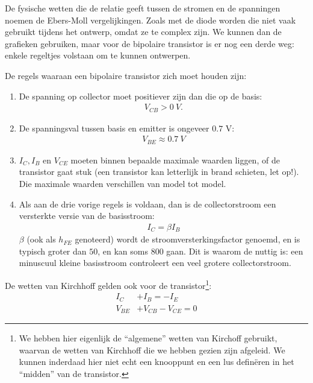 \documentclass{article}
\begin{document}
				De fysische wetten die de relatie geeft tussen de stromen en de spanningen noemen de Ebers-Moll vergelijkingen. Zoals met de diode worden die niet vaak gebruikt tijdens het ontwerp, omdat ze te complex zijn. We kunnen dan  de grafieken gebruiken, maar voor de bipolaire transistor is er nog een derde weg: enkele regeltjes volstaan om te kunnen ontwerpen. 

				De regels waaraan een bipolaire transistor zich moet houden zijn:
				\begin{enumerate}
					\item De spanning op collector moet positiever zijn dan die op de basis: 
					\begin{align}
					    V_{CB} > 0~V. 
					\end{align}

					\item De spanningsval tussen basis en emitter is ongeveer $0.7$ V: 
					\begin{align}
					    V_{BE} \approx 0.7~V
					\end{align}

					\item $I_C, I_B$ en $V_{CE} $ moeten binnen bepaalde maximale waarden liggen, of de transistor gaat stuk (een transistor kan letterlijk in brand schieten, let op!). Die maximale waarden verschillen van model tot model.

					\item Als aan de drie vorige regels is voldaan, dan is de collectorstroom een versterkte versie van de basisstroom: 
					\begin{align}
					    I_C = \beta I_B
					    \label{eq:hfe}
					\end{align}
					$\beta$ (ook als $h_{FE}$ genoteerd) wordt de stroomversterkingsfactor genoemd, en is typisch groter dan $50$, en kan soms $800$ gaan. Dit is waarom de nuttig is: een minuscuul kleine basisstroom controleert een veel grotere collectorstroom.

				\end{enumerate}

				De wetten van Kirchhoff gelden ook voor de transistor\footnote{We hebben hier eigenlijk de ``algemene'' wetten van Kirchoff gebruikt, waarvan de wetten van Kirchhoff die we hebben gezien zijn afgeleid. We kunnen inderdaad hier niet echt een knooppunt en een lus defin\"eren in het ``midden'' van de transistor.}:
				\begin{align}
				    I_C		&+ I_B = -I_E \\
				    V_{BE}  &+ V_{CB} - V_{CE} = 0
				\end{align}
\end{document}
